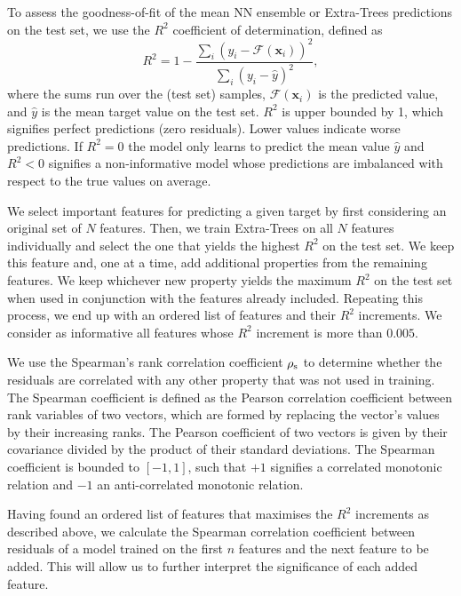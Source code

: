 \documentclass[useAMS,usenatbib]{mnras}
\begin{document}
To assess the goodness-of-fit of the mean NN ensemble or Extra-Trees predictions on the test set, we use the $R^2$ coefficient of determination, defined as
\begin{equation}
    R^2
    = 1 - \frac{\sum_{i} \left(y_i - \mathcal{F}(\bm{x}_i)\right)^2}{\sum_{i} \left(y_i - \hat{y}\right)^2},
\end{equation}
where the sums run over the (test set) samples, $\mathcal{F}(\bm{x}_i)$ is the predicted value,  and $\hat{y}$ is the mean target value on the test set. $R^2$ is upper bounded by 1, which signifies perfect predictions (zero residuals). Lower values indicate worse predictions. If $R^2 = 0$ the model only learns to predict the mean value $\hat{y}$ and $R^2 < 0$ signifies a non-informative model whose predictions are imbalanced with respect to the true values on average.

We select important features for predicting a given target by first considering an original set of $N$ features. Then, we train Extra-Trees on all $N$ features individually and select the one that yields the highest $R^2$ on the test set. We keep this feature and, one at a time, add additional properties from the remaining features. We keep whichever new property yields the maximum $R^2$ on the test set when used in conjunction with the features already included. Repeating this process, we end up with an ordered list of features and their $R^2$ increments. We consider as informative all features whose $R^2$ increment is more than $0.005$.

We use the Spearman's rank correlation coefficient $\rho_{\rm s}$ to determine whether the residuals are correlated with any other property that was not used in training. The Spearman coefficient is defined as the Pearson correlation coefficient between rank variables of two vectors, which are formed by replacing the vector's values by their increasing ranks. The Pearson coefficient of two vectors is given by their covariance divided by the product of their standard deviations. The Spearman coefficient is bounded to $\left[-1, 1\right]$, such that $+1$ signifies a correlated monotonic relation and $-1$ an anti-correlated monotonic relation.

Having found an ordered list of features that maximises the $R^2$ increments as described above, we calculate the Spearman correlation coefficient between residuals of a model trained on the first $n$ features and the next feature to be added. This will allow us to further interpret the significance of each added feature.
\end{document}
